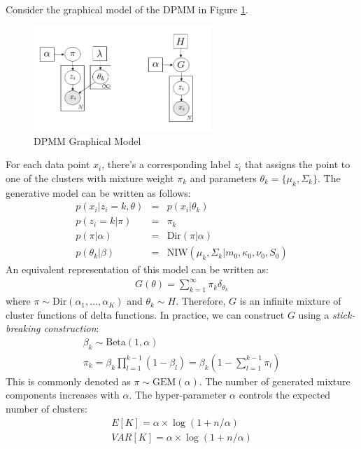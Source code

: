 Consider the graphical model of the DPMM in Figure \ref{fig:dpmm_gm}.
\begin{figure}[thpb]
    \centering
    \includegraphics[width=0.6\textwidth, trim={10 10 10 10}]{figures/dpmm_gm.png}
    \caption{DPMM Graphical Model}
    \label{fig:dpmm_gm}
\end{figure}
For each data point $x_i$, there's a corresponding label $z_i$ that assigns the point to one of the clusters with mixture weight $\pi_k$ and parameters $\theta_k = \{\mu_k, \Sigma_k\}$. The generative model can be written as follows:
\begin{eqnarray}
    p(x_i|z_i=k,\theta) &=& p(x_i|\theta_k) \\
    p(z_i=k|\pi) &=& \pi_k \\
    p(\pi|\alpha) &=& \mathrm{Dir}(\pi|\alpha) \\
    p(\theta_k|\beta) &=& \mathrm{NIW}(\mu_k,\Sigma_k|m_0,\kappa_0,\nu_0,S_0)
\end{eqnarray}
An equivalent representation of this model can be written as:
\begin{eqnarray}
    G(\theta) = \sum_{k=1}^{\infty}\pi_k \delta_{\theta_k}
\end{eqnarray}
where $\pi \sim \mathrm{Dir}(\alpha_1,...,\alpha_K)$ and $\theta_k \sim H$. Therefore, $G$ is an infinite mixture of cluster functions of delta functions. In practice, we can construct $G$ using a \textit{stick-breaking construction}:
\begin{eqnarray}
    \beta_k \sim \mathrm{Beta}(1,\alpha)\\
    \pi_k = \beta_k \prod_{l=1}^{k-1}(1-\beta_l) = \beta_k(1-\sum_{l=1}^{k-1}\pi_l)
\end{eqnarray}
This is commonly denoted as $\pi \sim \mathrm{GEM}(\alpha)$. The number of generated mixture components increases with $\alpha$. The hyper-parameter $\alpha$ controls the expected number of clusters:
\begin{eqnarray}
    E[K] = \alpha \times \log(1+n/\alpha)\\
    VAR[K] = \alpha \times \log(1+n/\alpha)
\end{eqnarray}
